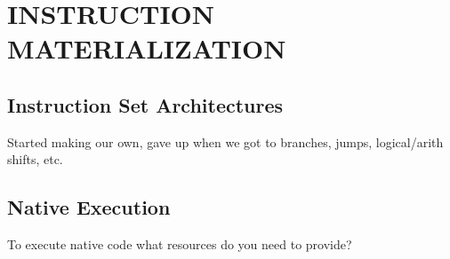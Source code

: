 \chapter{INSTRUCTION MATERIALIZATION}
\label{insn}

\section{Instruction Set Architectures}
\label{invest:isa}
Started making our own, gave up when we got to branches, jumps, logical/arith shifts, etc.

\section{Native Execution}
\label{invest:native}
To execute native code what resources do you need to provide?
